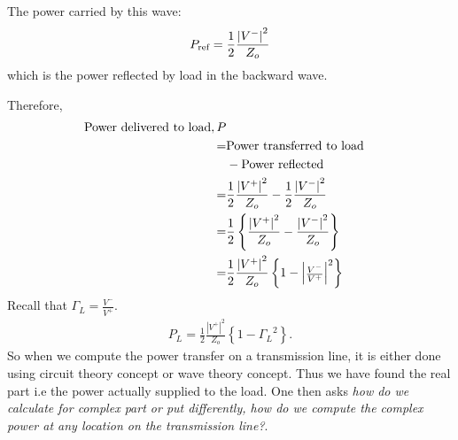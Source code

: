 The power carried by this wave:
\begin{align*}
P_{\textnormal{ref}} = \frac{1}{2}\frac{{|V^-|}^2}{Z_o}
\end{align*}
which is the power reflected by load in the backward wave.

Therefore,
\begin{align*} 
\textnormal{Power delivered to load}, P\\
=& \textnormal{Power transferred to load}\\
&- \textnormal{Power reflected}\\
=& \frac{1}{2} \frac{{|V^+|}^2}{Z_o} -\frac{1}{2} \frac{{|V^-|}^2 }{Z_o}\\
=& \frac{1}{2} \left\lbrace \frac{{|V^+| }^2}{Z_o} -\frac{ {|V^-|}^2 }{Z_o} \right\rbrace\\
=& \frac{1}{2} \frac{{|V^+|}^2}{Z_o} \left\lbrace 1 - {
\begin{vmatrix}
\frac{V^-}{V^+}
\end{vmatrix}^2}\right\rbrace
\end{align*}
Recall that $\Gamma_L =\frac{V^-}{V^+}$.
\begin{align*}
P_L=\frac{1}{2} \frac{{|V^+|}^2}{Z_o} \left\lbrace 1 - { \Gamma_L }^2 \right\rbrace.
\end{align*}
So when we compute the power transfer on a transmission line, it is either done using circuit theory concept or wave theory concept. Thus we have found the real part i.e the power actually supplied to the load. One then asks \emph{how do we calculate for complex part or put differently, how do we compute the complex power at any location on the transmission line?}. 


